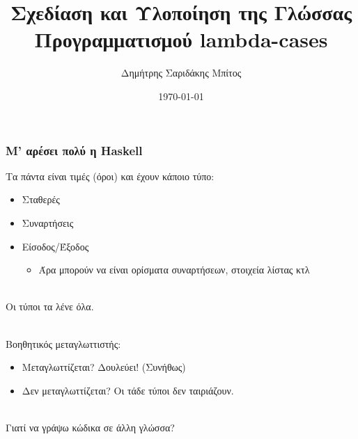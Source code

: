 \documentclass{beamer}
\date{\today}
\author{Δημήτρης Σαριδάκης Μπίτος}
\institute{Εθνικό Μετσόβιο Πολυτεχνείο}
\def\e{\foreignlanguage{english}}
\def\h{\e{Haskell}}
\begin{document}
\title{Σχεδίαση και Υλοποίηση της Γλώσσας Προγραμματισμού \e{lambda-cases}}
\frame{\titlepage}

\begin{frame}

\frametitle{Μ' αρέσει πολύ η \h}

Τα πάντα είναι τιμές (όροι) και έχουν κάποιο τύπο:

\begin{itemize}

\item Σταθερές
\item Συναρτήσεις
\item Είσοδος/Έξοδος

\begin{itemize}

\item Άρα μπορούν να είναι ορίσματα συναρτήσεων, στοιχεία λίστας κτλ
\\~\
\end{itemize}

\end{itemize}

Οι τύποι τα λένε όλα.
\\~\

Βοηθητικός μεταγλωττιστής:

\begin{itemize}

\item Μεταγλωττίζεται? Δουλεύει! (Συνήθως)

\item Δεν μεταγλωττίζεται? Οι τάδε τύποι δεν ταιριάζουν.
\\~\

\end{itemize}

Γιατί να γράψω κώδικα σε άλλη γλώσσα?

\end{frame}
\end{document}
